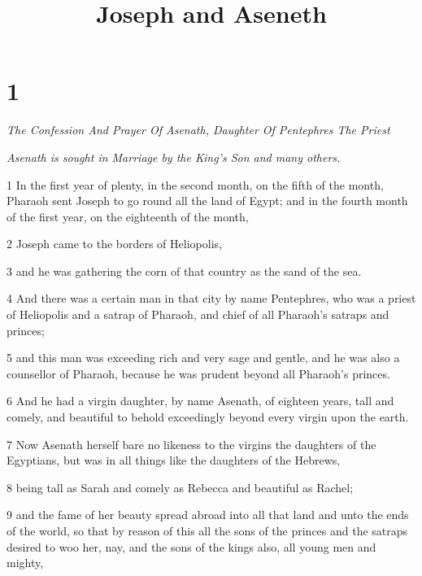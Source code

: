 


\title{Joseph and Aseneth}

\chapter{1}

\par \textit{The Confession And Prayer Of Asenath, Daughter Of Pentephres The Priest}

\par \textit{Asenath is sought in Marriage by the King's Son and many others.}

\par 1 In the first year of plenty, in the second month, on the fifth of the month, Pharaoh sent Joseph to go round all the land of Egypt; and in the fourth month of the first year, on the eighteenth of the month, 

\par 2 Joseph came to the borders of Heliopolis, 

\par 3 and he was gathering the corn of that country as the sand of the sea. 

\par 4 And there was a certain man in that city by name Pentephres, who was a priest of Heliopolis and a satrap of Pharaoh, and chief of all Pharaoh's satraps and princes; 

\par 5 and this man was exceeding rich and very sage and gentle, and he was also a counsellor of Pharaoh, because he was prudent beyond all Pharaoh's princes. 

\par 6 And he had a virgin daughter, by name Asenath, of eighteen years, tall and comely, and beautiful to behold exceedingly beyond every virgin upon the earth. 

\par 7 Now Asenath herself bare no likeness to the virgins the daughters of the Egyptians, but was in all things like the daughters of the Hebrews, 

\par 8 being tall as Sarah and comely as Rebecca and beautiful as Rachel; 

\par 9 and the fame of her beauty spread abroad into all that land and unto the ends of the world, so that by reason of this all the sons of the princes and the satraps desired to woo her, nay, and the sons of the kings also, all young men and mighty, 

